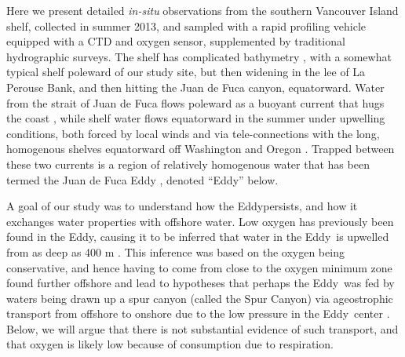 \documentclass[draft]{agujournal2019}
\newcommand*{\Eddy}{{\sc Eddy}}
\begin{document}
Here we present detailed \emph{in-situ} observations from the southern Vancouver Island shelf, collected in summer 2013, and sampled with a rapid profiling vehicle equipped with a CTD and oxygen sensor, supplemented by traditional hydrographic surveys. The shelf has complicated bathymetry , with a somewhat typical shelf poleward of our study site, but then widening in the lee of La Perouse Bank, and then hitting the Juan de Fuca canyon, equatorward.  Water from the strait of Juan de Fuca flows poleward as a buoyant current that hugs the coast \cite{thomsonetal89, hickeyetal91}, while shelf water flows equatorward in the summer under upwelling conditions, both forced by local winds and via tele-connections with the long, homogenous shelves equatorward off Washington and Oregon \cite{hickeyetal91,thomsonkrassovski15,engidaetal16}.  Trapped between these two currents is a region of relatively homogenous water that has been termed the Juan de Fuca Eddy \cite{freelanddenman82,freelandmcintosh89,foremanetal07,macfadyenhickey10}, denoted ``\Eddy'' below.

A goal of our study was to understand how the \Eddy persists, and how it exchanges water properties with offshore water.  Low oxygen has previously been found in the \Eddy, causing it to be inferred that water in the \Eddy\ is upwelled from as deep as 400 m \cite{freelanddenman82,deweycrawford88}.  This inference was based on the oxygen being conservative, and hence having to come from close to the oxygen minimum zone found further offshore \cite{mackasetal87} and lead to hypotheses that perhaps the \Eddy\ was fed by waters being drawn up a spur canyon (called the Spur Canyon) via ageostrophic transport from offshore to onshore due to the low pressure in the \Eddy\ center \cite{weaverhsieh87}.  Below, we will argue that there is not substantial evidence of such transport, and that oxygen is likely low because of consumption due to respiration.
\end{document}
